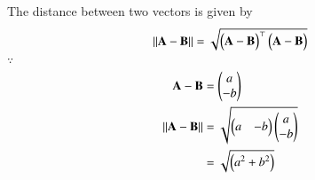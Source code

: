 The distance between two vectors is given by 
\begin{align}
\label{1/4/eq5}
\norm{\vec{A}-\vec{B}}&= \sqrt{\myvec{\vec{A}-\vec{B}}^\top\myvec{\vec{A}-\vec{B}}}\\
\end{align}
$\because $
\begin{align}
\mathbf{A}-\mathbf{B}&=\begin{pmatrix}a\\-b\end{pmatrix}
\\
\left\lVert\mathbf{A}-\mathbf{B}\right\rVert&=\sqrt{\begin{pmatrix}a & -b\end{pmatrix}\begin{pmatrix}a\\-b\end{pmatrix}} \\
	&=\sqrt{\begin{pmatrix}a^2+b^2\end{pmatrix}} 
\end{align}
